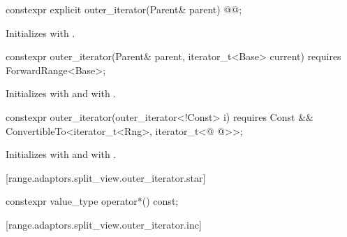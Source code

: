 {%
\begin{itemdecl}
constexpr explicit outer_iterator(Parent& parent)
  @@;
\end{itemdecl}

\begin{itemdescr}
\pnum
\effects Initializes  with .
\end{itemdescr}

%
\begin{itemdecl}
constexpr outer_iterator(Parent& parent, iterator_t<Base> current)
  requires ForwardRange<Base>;
\end{itemdecl}

\begin{itemdescr}
\pnum
\effects Initializes  with 
and  with .
\end{itemdescr}

%
\begin{itemdecl}
constexpr outer_iterator(outer_iterator<!Const> i) requires Const &&
  ConvertibleTo<iterator_t<Rng>, iterator_t<@ @>>;
\end{itemdecl}

\begin{itemdescr}
\pnum
\effects Initializes  with  and  with .
\end{itemdescr}

[range.adaptors.split_view.outer_iterator.star]{}

%
\begin{itemdecl}
constexpr value_type operator*() const;
\end{itemdecl}

\begin{itemdescr}
\pnum
\oldtxt{\returns}  
\end{itemdescr}

[range.adaptors.split_view.outer_iterator.inc]{}

}
